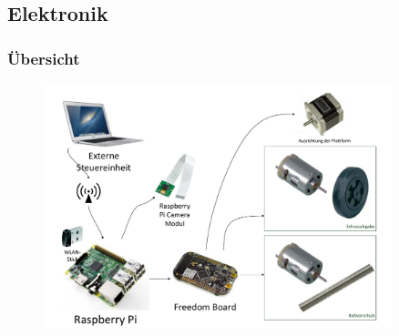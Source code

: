 \subsection{Elektronik}

\author{Ervin Mazlagi\'c}

\begin{frame}
	\frametitle{Übersicht\hfill{}\footnotesize \group}
	
	\begin{figure}
		\centering
		\includegraphics[width=0.9\textwidth]{../../fig/blockdiagramm-fuer-presi.pdf}
	\end{figure}
	
\end{frame}

